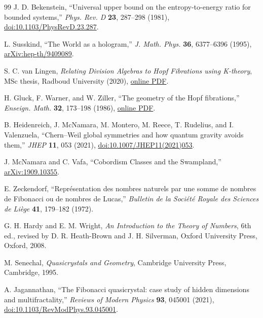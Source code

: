 \documentclass[aps,prd,reprint,nofootinbib,superscriptaddress,floatfix]{revtex4-2}
\numberwithin{equation}{section}
\theoremstyle{definition}
\theoremstyle{plain}
\begin{document}
\begin{thebibliography}{99}
J. D. Bekenstein,
``Universal upper bound on the entropy-to-energy ratio for bounded systems,''
\emph{Phys. Rev. D} \textbf{23}, 287--298 (1981),
\href{https://doi.org/10.1103/PhysRevD.23.287}{doi:10.1103/PhysRevD.23.287}.

L. Susskind,
``The World as a hologram,''
\emph{J. Math. Phys.} \textbf{36}, 6377--6396 (1995),
\href{https://arxiv.org/abs/hep-th/9409089}{arXiv:hep-th/9409089}.

S. C. van Lingen,
\emph{Relating Division Algebras to Hopf Fibrations using K-theory},
MSc thesis, Radboud University (2020),
\href{https://www.waltervansuijlekom.nl/wp-content/uploads/2020/08/thesisSuzanvLingen.pdf}{online PDF}.

H. Gluck, F. Warner, and W. Ziller,
``The geometry of the Hopf fibrations,''
\emph{Enseign. Math.} \textbf{32}, 173--198 (1986),
\href{https://ncatlab.org/nlab/files/GluckWarnerZiller-HopfFibrations.pdf}{online PDF}.

B. Heidenreich, J. McNamara, M. Montero, M. Reece, T. Rudelius, and I. Valenzuela,
``Chern--Weil global symmetries and how quantum gravity avoids them,''
\emph{JHEP} \textbf{11}, 053 (2021),
\href{https://doi.org/10.1007/JHEP11(2021)053}{doi:10.1007/JHEP11(2021)053}.

J. McNamara and C. Vafa,
``Cobordism Classes and the Swampland,''
\href{https://arxiv.org/abs/1909.10355}{arXiv:1909.10355}.



E. Zeckendorf,
``Repr\'esentation des nombres naturels par une somme de nombres de Fibonacci ou de nombres de Lucas,''
\emph{Bulletin de la Soci\'et\'e Royale des Sciences de Li\`ege}
\textbf{41}, 179--182 (1972).

G. H. Hardy and E. M. Wright,
\emph{An Introduction to the Theory of Numbers},
6th ed., revised by D. R. Heath-Brown and J. H. Silverman,
Oxford University Press, Oxford, 2008.

M. Senechal,
\emph{Quasicrystals and Geometry},
Cambridge University Press, Cambridge, 1995.

A. Jagannathan,
``The Fibonacci quasicrystal: case study of hidden dimensions and multifractality,''
\emph{Reviews of Modern Physics} \textbf{93}, 045001 (2021),
\href{https://doi.org/10.1103/RevModPhys.93.045001}{doi:10.1103/RevModPhys.93.045001}.


\end{thebibliography}
\end{document}
